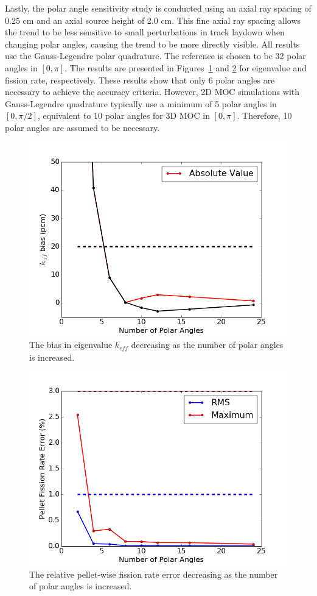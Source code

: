 Lastly, the polar angle sensitivity study is conducted using an axial ray spacing of 0.25 cm and an axial source height of 2.0 cm. This fine axial ray spacing allows the trend to be less sensitive to small perturbations in track laydown when changing polar angles, causing the trend to be more directly visible. All results use the Gauss-Legendre polar quadrature. The reference is chosen to be 32 polar angles in $[0, \pi]$. The results are presented in Figures~\ref{fig:polar-angles-pcm} and \ref{fig:polar-angles-fr} for eigenvalue and fission rate, respectively. These results show that only 6 polar angles are necessary to achieve the accuracy criteria. However, 2D \ac{MOC} simulations with Gauss-Legendre quadrature typically use a minimum of 5 polar angles in $[0,\pi/2]$, equivalent to 10 polar angles for 3D \ac{MOC} in $[0,\pi]$. Therefore, 10 polar angles are assumed to be necessary.

\begin{figure}[h!]
	\centering
	\includegraphics[width=0.7\linewidth]{figures/results/sensitivity/polar_angles_pcm.png}
	\caption[]{The bias in eigenvalue $k_{\textit{eff}}$ decreasing as the number of polar angles is increased.}
	\label{fig:polar-angles-pcm}
\end{figure}
\begin{figure}[h!]
	\centering
	\includegraphics[width=0.7\linewidth]{figures/results/sensitivity/polar_angles_fr.png}
	\caption[]{The relative pellet-wise fission rate error decreasing as the number of polar angles is increased.}
	\label{fig:polar-angles-fr}
\end{figure}


